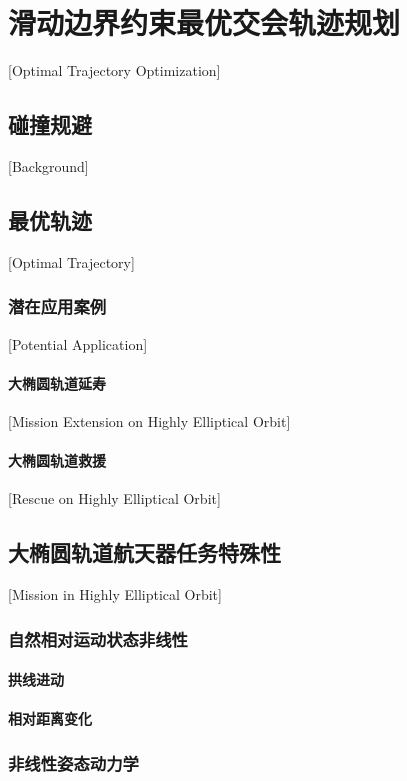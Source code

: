 
\chapter[轨迹规划]{滑动边界约束最优交会轨迹规划}[Optimal Trajectory Optimization]

\section{碰撞规避}[Background]

\section{最优轨迹}[Optimal Trajectory]

\subsection{潜在应用案例}[Potential Application]

\subsubsection{大椭圆轨道延寿}[Mission Extension on Highly Elliptical Orbit]

\subsubsection{大椭圆轨道救援}[Rescue on Highly Elliptical Orbit]

\section{大椭圆轨道航天器任务特殊性}[Mission in Highly Elliptical Orbit]
\subsection{自然相对运动状态非线性}
\subsubsection{拱线进动}
\subsubsection{相对距离变化}
\subsection{非线性姿态动力学}
